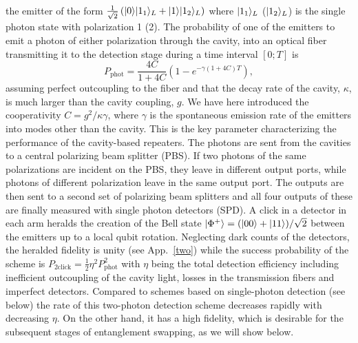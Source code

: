 the emitter of the form
$\frac{1}{\sqrt{2}}\left(| 0 \rangle| 1_{1} \rangle_{L}+| 1 \rangle| 1_{2} \rangle_{L}\right)$
where $| 1_{1} \rangle_{L}$ ($| 1_{2} \rangle_{L}$) is the single photon state with
polarization 1 (2). The probability of one of the emitters to emit a photon of
either polarization through the cavity, into an optical fiber transmitting it to
the detection stage during a time interval $[0;T]$ is
\begin{equation} \label{eq:phot1}
P_{\mathrm{phot}}=\frac{4C}{1+4C}\left(1-e^{-\gamma(1+4C)T}\right), 
\end{equation} 
assuming perfect outcoupling to the fiber and that the decay rate of the cavity,
$\kappa$, is much larger than the cavity coupling, $g$. We have here introduced
the cooperativity $C=g^{2}/\kappa\gamma$, where $\gamma$ is the spontaneous
emission rate of the emitters into modes other than the cavity. This is the key
parameter characterizing the performance of the cavity-based repeaters. The
photons are sent from the cavities to a central polarizing beam splitter (PBS).
If two photons of the same polarizations are incident on the PBS, they leave in
different output ports, while photons of different polarization leave in the
same output port. The outputs are then sent to a second set of polarizing beam
splitters and all four outputs of these are finally measured with single photon
detectors (SPD). A click in a detector in each arm heralds the creation of the
Bell state $| \Phi^{+} \rangle=(| 00 \rangle+| 11 \rangle)/\sqrt{2}$ between the emitters up
to a local qubit rotation. Neglecting dark counts of the detectors, the heralded
fidelity is unity (see App.~\ref{two}) while the success probability of the
scheme is $P_{\mathrm{2click}}=\frac{1}{2}\eta^{2}P_{\mathrm{phot}}^{2}$ with $\eta$
being the total detection efficiency including inefficient outcoupling of the
cavity light, losses in the transmission fibers and imperfect detectors.
Compared to schemes based on single-photon detection (see below) the rate of
this two-photon detection scheme decreases rapidly with decreasing $\eta$. On
the other hand, it has a high fidelity, which is desirable for the subsequent
stages of entanglement swapping, as we will show below.

